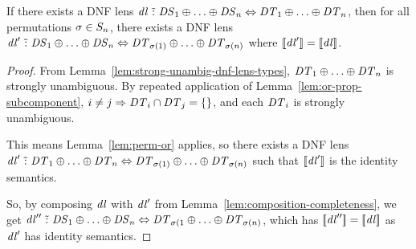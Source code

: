 \documentclass[acmsmall]{acmart}
\begin{document}
\begin{lemma}
  \label{lem:or-dnf-reordering-right}
  If there exists a DNF lens $\mathit{dl} \,\,\tilde{:}\,\, \mathit{DS}_1 \oplus \ldots
  \oplus \mathit{DS}_n \Leftrightarrow
  \mathit{DT}_1 \oplus \ldots \oplus \mathit{DT}_n$, then for all permutations
  $\sigma \in S_{n}$, there exists a DNF lens $\mathit{dl}'
  \,\,\tilde{:}\,\, \mathit{DS}_1 \oplus \ldots \oplus \mathit{DS}_n
  \Leftrightarrow
  \mathit{DT}_{\sigma(1)} \oplus \ldots \oplus \mathit{DT}_{\sigma(n)}$ where
  $[ \! [\mathit{dl}'] \! ] = [ \! [\mathit{dl}] \! ]$.
\end{lemma}
\begin{proof}
  From Lemma~\ref{lem:strong-unambig-dnf-lens-types},
  $\mathit{DT}_1 \oplus \ldots \oplus \mathit{DT}_n$ is strongly unambiguous.
  By repeated application of Lemma~\ref{lem:or-prop-subcomponent},
  $i \neq j \Rightarrow \mathit{DT}_i \cap \mathit{DT}_j =
  \{\}$, and each $\mathit{DT}_i$ is strongly unambiguous.

  This means Lemma~\ref{lem:perm-or} applies, so there exists a DNF lens
  $\mathit{dl}' \,\,\tilde{:}\,\, \mathit{DT}_1 \oplus \ldots \oplus
  \mathit{DT}_n \Leftrightarrow
  \mathit{DT}_{\sigma(1)} \oplus \ldots \oplus \mathit{DT}_{\sigma(n)}$ such
  that $[ \! [\mathit{dl}'] \! ]$ is the identity semantics.

  So, by composing $\mathit{dl}$ with $\mathit{dl}'$ from
  Lemma~\ref{lem:composition-completeness}, we get
  $\mathit{dl}'' \,\,\tilde{:}\,\, \mathit{DS}_1 \oplus \ldots \oplus \mathit{DS}_n
  \Leftrightarrow \mathit{DT}_{\sigma(1} \oplus \ldots \oplus
  \mathit{DT}_{\sigma(n)}$, which has $[ \! [\mathit{dl}''] \! ] =
  [ \! [\mathit{dl}] \! ]$ as $\mathit{dl}'$ has identity semantics.
\end{proof}
\end{document}

